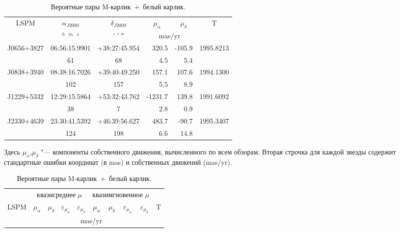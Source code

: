 \begin{table}[t]
\vspace{6mm}
\centering
\caption{Вероятные пары \glqq M-карлик~+~белый карлик\grqq.}
\label{tab:MDWD}
\vspace{5mm}

\begin{tabularx}{\textwidth}{c|c|c|r|r|c} 
\hline
\multirow{2}{*}{LSPM} & $\alpha_{J2000}$ & $\delta_{J2000}$ &\multicolumn{1}{c|}{$\mu_\alpha$}&\multicolumn{1}{c|}{$\mu_\delta$}& \multirow{2}{*}{T} \\ \cline{2-5}
& $^h$~$^m$~$^s$  & $^\circ~'~''$ & \multicolumn{2}{c|}{mas/yr} & \\ \hline
J0656+3827 & 06:56:15.9901 & +38:27:45.954 &   320.5 & -105.9 & 1995.8213 \\
           & 61            & 68            &     4.5 &    5.4 & \\
J0838+3940 & 08:38:16.7026 & +39:40:49.250 &   157.1 &  107.6 & 1994.1300 \\
           & 102           & 157           &     5.5 &    8.9 & \\
J1229+5332 & 12:29:15.5864 & +53:32:43.762 & -1231.7 &  139.8 & 1991.6092 \\
           & 38            & 7             &     2.8 &    0.9 & \\
J2330+4639 & 23:30:41.5392 & +46:39:56.627 &   483.7 &  -90.7 & 1995.3407 \\
           & 124           & 198           &     6.6 &   14.8 & \\ \hline
\end{tabularx}
\begin{flushleft}
\footnotesize     
Здесь $\mu_\alpha$,$\mu_\delta$ "--- компоненты собственного движения, вычисленного по всем обзорам. Вторая строчка для каждой звезды содержит стандартные ошибки координат (в mas) и собственных движений (mas/yr).
\end{flushleft}
\begin{tabularx}{\textwidth}{l|r|r|r|r|r|r|r|r|c} \hline
     & \multicolumn{4}{c|}{квазисреднее $\mu$ }
     &\multicolumn{4}{c|}{квазимгновенное $\mu$}&  \\ \cline{2-9}
\multicolumn{1}{c|}{LSPM}&\multicolumn{1}{c|}{$\mu_\alpha$}&\multicolumn{1}{c|}{$\mu_\delta$}&\multicolumn{1}{c|}{$\varepsilon_{\mu_\alpha}$}&\multicolumn{1}{c|}{$\varepsilon_{\mu_\delta}$}
	 &\multicolumn{1}{c|}{$\mu_\alpha$}&\multicolumn{1}{c|}{$\mu_\delta$}&\multicolumn{1}{c|}{$\varepsilon_{\mu_\alpha}$}&\multicolumn{1}{c|}{$\varepsilon_{\mu_\delta}$}
	 &   T\\ \cline{2-9} 
     &\multicolumn{8}{c|}{mas/yr}&\\ \hline


\end{tabularx}
\end{table}
